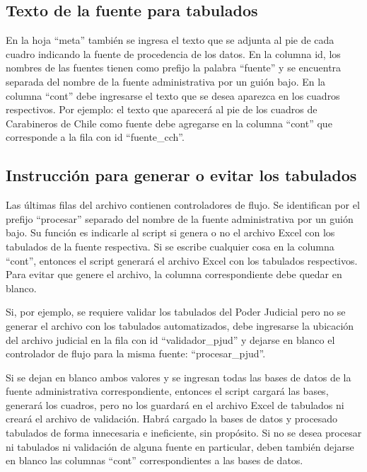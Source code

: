 \documentclass[
  spanish,
]{book}
\begin{document}
\hypertarget{texto-de-la-fuente-para-tabulados}{%
\subsection{Texto de la fuente para tabulados}\label{texto-de-la-fuente-para-tabulados}}

En la hoja ``meta'' también se ingresa el texto que se adjunta al pie de cada cuadro indicando la fuente de procedencia de los datos. En la columna id, los nombres de las fuentes tienen como prefijo la palabra ``fuente'' y se encuentra separada del nombre de la fuente administrativa por un guión bajo. En la columna ``cont'' debe ingresarse el texto que se desea aparezca en los cuadros respectivos. Por ejemplo: el texto que aparecerá al pie de los cuadros de Carabineros de Chile como fuente debe agregarse en la columna ``cont'' que corresponde a la fila con id ``fuente\_cch''.

\hypertarget{instrucciuxf3n-para-generar-o-evitar-los-tabulados}{%
\subsection{Instrucción para generar o evitar los tabulados}\label{instrucciuxf3n-para-generar-o-evitar-los-tabulados}}

Las últimas filas del archivo contienen controladores de flujo. Se identifican por el prefijo ``procesar'' separado del nombre de la fuente administrativa por un guión bajo. Su función es indicarle al script si genera o no el archivo Excel con los tabulados de la fuente respectiva. Si se escribe cualquier cosa en la columna ``cont'', entonces el script generará el archivo Excel con los tabulados respectivos. Para evitar que genere el archivo, la columna correspondiente debe quedar en blanco.

Si, por ejemplo, se requiere validar los tabulados del Poder Judicial pero no se generar el archivo con los tabulados automatizados, debe ingresarse la ubicación del archivo judicial en la fila con id ``validador\_pjud'' y dejarse en blanco el controlador de flujo para la misma fuente: ``procesar\_pjud''.

Si se dejan en blanco ambos valores y se ingresan todas las bases de datos de la fuente administrativa correspondiente, entonces el script cargará las bases, generará los cuadros, pero no los guardará en el archivo Excel de tabulados ni creará el archivo de validación. Habrá cargado la bases de datos y procesado tabulados de forma innecesaria e ineficiente, sin propósito. Si no se desea procesar ni tabulados ni validación de alguna fuente en particular, deben también dejarse en blanco las columnas ``cont'' correspondientes a las bases de datos.
\end{document}
